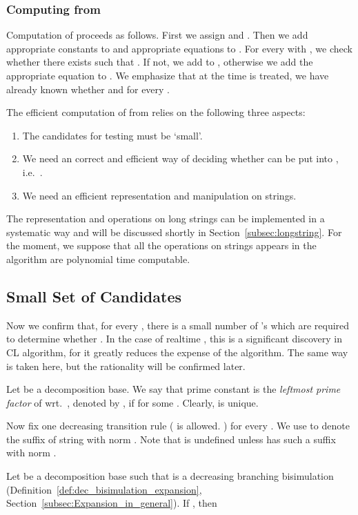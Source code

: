 \documentclass{llncs}
\begin{document}
\subsubsection{Computing   from }

Computation of  proceeds as follows. First we assign  and . Then we add
appropriate constants to  and appropriate equations to . For every  with , we check whether there exists  such that . If not, we
add  to , otherwise we add the appropriate equation  to . We emphasize that at the time  is treated, we have already known whether  and  for every .

The efficient computation of    from  relies on the following three aspects:
\begin{enumerate}
\item
The candidates  for testing  must be `small'.

\item
We need an correct and efficient way of deciding whether  can be put into , i.e.~.

\item
We need an efficient representation and manipulation on strings.
\end{enumerate}




The representation and operations on long strings can be implemented in a systematic way  and will be discussed shortly in Section~\ref{subsec:longstring}.    For the moment, we suppose that all the operations on strings  appears in the algorithm are polynomial time computable.



\subsection{Small Set of Candidates}\label{subsec:candidates}






Now we confirm that, for every , there is a small number of 's which are required to determine whether .  In the case of realtime , this is a significant discovery in CL algorithm, for it greatly reduces the expense of the algorithm.  The same way is taken here, but the rationality will be confirmed later.

Let  be a decomposition base.  We say that prime constant  is the
{\em leftmost prime factor} of  wrt.~, denoted by , if  for some . Clearly,  is unique.

Now fix one decreasing  transition rule  ( is allowed. ) for every .   We use  to denote the suffix of string  with norm . Note that  is undefined unless  has such a suffix with norm .
\begin{proposition}\label{prop:lpf1}
Let  be a decomposition base such that  is a decreasing branching bisimulation (Definition~\ref{def:dec_bisimulation_expansion}, Section~\ref{subsec:Expansion_in_general}).  If , then

\end{proposition}
\end{document}
